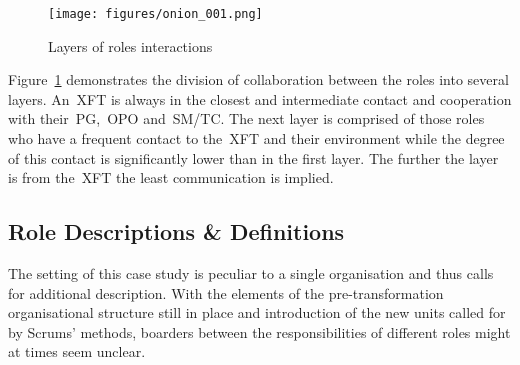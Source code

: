 \begin{figure}[h!]
  \centering
  \texttt{[image: figures/onion\_001.png]}
  \caption{Layers of roles interactions}
  \label{onion}
\end{figure}

Figure~\ref{onion} demonstrates the division of collaboration between the roles into several layers. An~\ac{XFT} is always in the closest and intermediate contact and cooperation with their~\ac{PG},~\ac{OPO} and~\ac{SM}/\ac{TC}.  The next layer is comprised of those roles who have a frequent contact to the~\ac{XFT} and their environment while the degree of this contact is significantly lower than in the first layer.  The further the layer is from the~\ac{XFT} the least communication is implied.

\subsection{Role Descriptions \& Definitions}

The setting of this case study is peculiar to a single organisation and thus calls for additional description. With the elements of the pre-transformation organisational structure still in place and introduction of the new units called for by Scrums' methods, boarders between the responsibilities of different roles might at times seem unclear.

